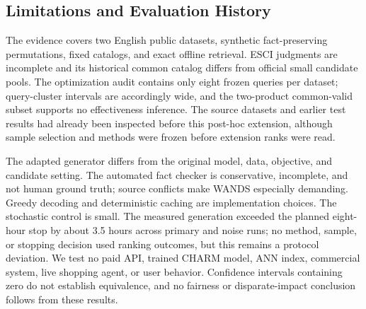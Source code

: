 \subsection{Limitations and Evaluation History}
The evidence covers two English public datasets, synthetic fact-preserving permutations, fixed catalogs, and exact offline retrieval. ESCI judgments are incomplete and its historical common catalog differs from official small candidate pools. The optimization audit contains only eight frozen queries per dataset; query-cluster intervals are accordingly wide, and the two-product common-valid subset supports no effectiveness inference. The source datasets and earlier test results had already been inspected before this post-hoc extension, although sample selection and methods were frozen before extension ranks were read.

The adapted generator differs from the original model, data, objective, and candidate setting. The automated fact checker is conservative, incomplete, and not human ground truth; source conflicts make WANDS especially demanding. Greedy decoding and deterministic caching are implementation choices. The stochastic control is small. The measured generation exceeded the planned eight-hour stop by about 3.5 hours across primary and noise runs; no method, sample, or stopping decision used ranking outcomes, but this remains a protocol deviation. We test no paid API, trained CHARM model, ANN index, commercial system, live shopping agent, or user behavior. Confidence intervals containing zero do not establish equivalence, and no fairness or disparate-impact conclusion follows from these results.
